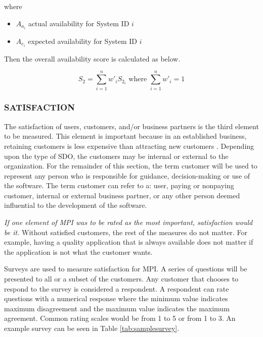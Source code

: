 \documentclass[SDSUThesis.tex]{subfiles}
\begin{document}
                where
                
                \begin{itemize}
                    \item $A_{a_i}$ actual availability for System ID $i$
                    \item $A_{e_i}$ expected availability for System ID $i$
                \end{itemize}
                
                Then the overall availability score is calculated as below.
                
                \[
                    S_{2} = \sum\limits^n_{i=1} w'_i S_{2_i} \text{ where } \sum\limits^n_{i=1} w'_i = 1
                \]
                
        \subsubsection{SATISFACTION}
            The satisfaction of users, customers, and/or business partners is 
            the third element to be measured.  This element is important because 
            in an established business, retaining customers is less expensive
            than attracting new customers \cite{Aulet2013}.  
            Depending upon the type of SDO,
            the customers may be internal or external to the organization.  For
            the remainder of this section, the term customer will be used
            to represent any person who is responsible for guidance, decision-making
            or use of the software.  The term customer can refer to a: user, paying or nonpaying
            customer, internal or external business partner, or any other person deemed influential
            to the development of the software.
            
            \textit{If one element of MPI was to be rated as the most important, satisfaction
            would be it.}  
            Without satisfied customers, the rest of the measures do not matter.
            For example, having a quality
            application that is always available does not matter if the
            application is not what the customer wants.  
            
            Surveys are used to measure satisfaction for MPI.  A series of questions will
            be presented to all or a subset of the customers.  Any customer that chooses
            to respond to the survey is considered a respondent.  A respondent can rate
            questions with a numerical response where the minimum value indicates maximum
            disagreement and the maximum value indicates
            the maximum agreement. Common rating scales would be
            from 1 to 5 or from 1 to 3.  An example survey can be seen in Table 
            \ref{tab:samplesurvey}.
            
\end{document}
